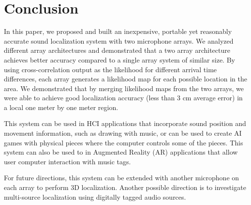 \section{Conclusion}
In this paper, we proposed and built an inexpensive, portable yet reasonably accurate sound localization system with two microphone arrays. We analyzed different array architectures and demonstrated that a two array architecture achieves better accuracy compared to a single array system of similar size. By using cross-correlation output as the likelihood for different arrival time differences, each array generates a likelihood map for each possible location in the area. We demonstrated that by merging likelihood maps from the two arrays, we were able to achieve good localization accuracy (less than $3$ cm average error) in a local one meter by one meter region.

This system can be used in HCI applications that incorporate sound position and movement information, such as drawing with music, or can be used to create AI games with physical pieces where the computer controls some of the pieces. This system can also be used to in Augmented Reality (AR) applications that allow user computer interaction with music tags.

For future directions, this system can be extended with another microphone on each array to perform 3D localization. Another possible direction is to investigate multi-source localization using digitally tagged audio sources.
